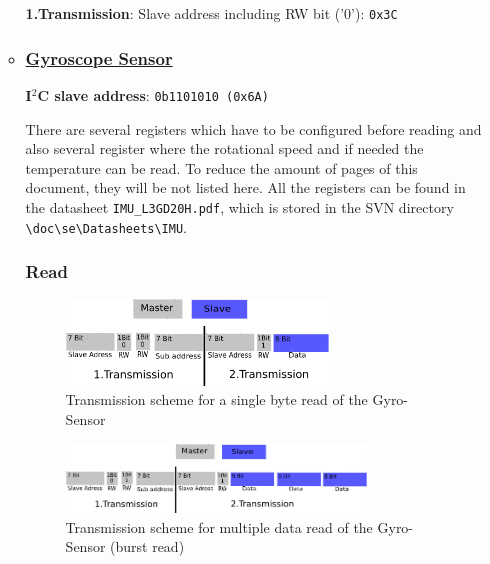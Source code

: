 \begin{itemize}
\begin{itemize}
\textbf{1.Transmission}: Slave address including RW bit ('0'): \texttt{0x3C}


\item \subsubsection*{\underline{\textbf{Gyroscope Sensor}}}
\label{sec:hardware:Components:Adressing:IMU:Gyro}

\textbf{I$^2$C slave address}: \texttt{0b1101010 (0x6A)}

There are several registers which have to be configured before reading and also several register where the rotational speed and if needed the temperature can be read. To reduce the amount of pages of this document, they will be not listed here. All the registers can be found in the datasheet \texttt{IMU\_L3GD20H.pdf}, which is stored in the SVN directory \texttt{\textbackslash{}doc\textbackslash{}se\textbackslash{}Datasheets\textbackslash{}IMU}.

\subsubsection{Read}
\label{subsubsec:Gyroread}

\begin{figure}[H]
	\centering\includegraphics[width=0.7\textwidth]{fig/I2C_Adressing/ACC_read_single}
	\caption{Transmission scheme for a single byte read of the Gyro-Sensor}
	\label{fig:Gyro1}
\end{figure}

\begin{figure}[H]
	\centering\includegraphics[width=0.8\textwidth]{fig/I2C_Adressing/ACC_read_multiple}
	\caption[Scheme for multiple data read of the Gyro-Sensor]{Transmission scheme for multiple data read of the Gyro-Sensor (burst read)}
	\label{fig:Gyro2}
\end{figure}


\end{itemize}
\end{itemize}
